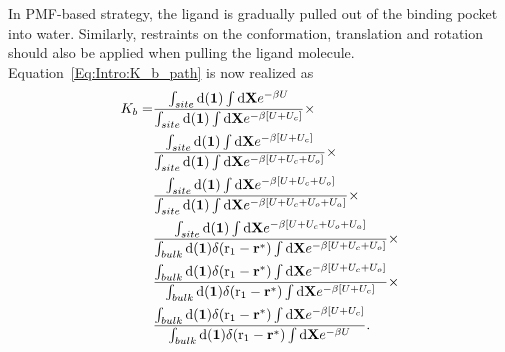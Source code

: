 In PMF-based strategy, the ligand is gradually pulled out of the binding pocket into water. Similarly, restraints on the conformation, translation and rotation should also be applied when pulling the ligand molecule. Equation~\ref{Eq:Intro:K_b_path} is now realized as
\begin{align}
K_b=&\frac{\int_{site}\diff(\mathbf{1})\int \diff\mathbf{X}e^{-\beta U}}{\int_{site}\diff(\mathbf{1})\int \diff\mathbf{X}e^{-\beta [U+U_c]}}\times\notag\\
    &\frac{\int_{site}\diff(\mathbf{1})\int \diff\mathbf{X}e^{-\beta [U+U_c]}}{\int_{site}\diff(\mathbf{1})\int \diff\mathbf{X}e^{-\beta [U+U_c+U_o]}}\times\notag\\
    &\frac{\int_{site}\diff(\mathbf{1})\int \diff\mathbf{X}e^{-\beta [U+U_c+U_o]}}{\int_{site}\diff(\mathbf{1})\int \diff\mathbf{X}e^{-\beta [U+U_c+U_o+U_a]}}\times\notag\\
    &\frac{\int_{site}\diff(\mathbf{1})\int \diff\mathbf{X}e^{-\beta [U+U_c+U_o+U_a]}}{\int_{bulk}\diff(\mathbf{1})\delta(\mathrm{r}_1-\mathbf{r}^*)\int \diff\mathbf{X}e^{-\beta [U+U_c+U_o]}}\times\notag\\
    &\frac{\int_{bulk}\diff(\mathbf{1})\delta(\mathrm{r}_1-\mathbf{r}^*)\int \diff\mathbf{X}e^{-\beta [U+U_c+U_o]}}{\int_{bulk}\diff(\mathbf{1})\delta(\mathrm{r}_1-\mathbf{r}^*)\int \diff\mathbf{X}e^{-\beta [U+U_c]}}\times\notag\\
    &\frac{\int_{bulk}\diff(\mathbf{1})\delta(\mathrm{r}_1-\mathbf{r}^*)\int \diff\mathbf{X}e^{-\beta [U+U_c]}}{\int_{bulk}\diff(\mathbf{1})\delta(\mathrm{r}_1-\mathbf{r}^*)\int \diff\mathbf{X}e^{-\beta U}}.
\end{align}
